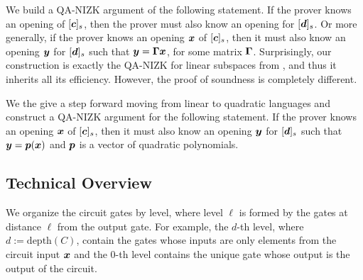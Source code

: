We build a QA-NIZK argument of the following statement. If the prover knows an opening of $[{\boldsymbol{c}}]_s$, then the prover must also know an opening for $[{\boldsymbol{d}}]_s$. Or more generally, if the prover knows an opening ${\boldsymbol{x}}$ of $[{\boldsymbol{c}}]_s$, then it must also know an opening ${\boldsymbol{y}}$ for $[{\boldsymbol{d}}]_s$ such that ${\boldsymbol{y}}=\mathbf{{\Gamma}}{\boldsymbol{x}}$, for some matrix $\mathbf{{\Gamma}}$. Surprisingly, our construction is exactly the QA-NIZK for linear subspaces from \cite{C:JutRoy14,EC:KilWee15,AC:GonHevRaf15}, and thus it inherits all its efficiency. However, the proof of soundness is completely different.

We the give a step forward moving from linear to quadratic languages and construct a QA-NIZK argument for the following statement. If the prover knows an opening ${\boldsymbol{x}}$ of $[{\boldsymbol{c}}]_s$, then it must also know an opening ${\boldsymbol{y}}$ for $[{\boldsymbol{d}}]_s$ such that ${\boldsymbol{y}}={\boldsymbol{p}}({\boldsymbol{x}})$ and ${\boldsymbol{p}}$ is a vector of quadratic polynomials.


\subsection{Technical Overview}
We organize the circuit gates by level, where level $\ell$ is formed by the gates at distance $\ell$ from the output gate. For example, the $d$-th level, where $d:=\mathrm{depth}({C})$, contain the gates whose inputs are only elements from the circuit input ${\boldsymbol{x}}$ and the $0$-th level contains the unique gate whose output is the output of the circuit.


